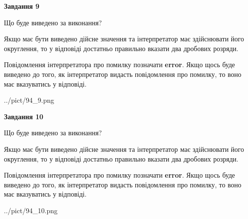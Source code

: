 \documentclass[12pt, ukrainian]{article}
\begin{document}
{\begin {Large}
{\begin {center}\textbf{Завдання 9}\end {center}}\par
Що буде виведено за виконання? \par

Якщо має бути виведено дійсне значення та інтерпретатор має здійснювати його округлення, 
то у відповіді достатньо правильно вказати два дробових розряди.

Повідомлення інтерпретатора про помилку позначати \textbf{error}.
Якщо щось буде виведено до того, як інтерпретатор видасть повідомлення про помилку, 
то воно має вказуватись у відповіді. \par

\begin{center}
	{../pict/94_9.png}
\end{center}
\newpage

{\begin {center}\textbf{Завдання 10}\end {center}}\par
Що буде виведено за виконання? \par

Якщо має бути виведено дійсне значення та інтерпретатор має здійснювати його округлення, 
то у відповіді достатньо правильно вказати два дробових розряди.

Повідомлення інтерпретатора про помилку позначати \textbf{error}.
Якщо щось буде виведено до того, як інтерпретатор видасть повідомлення про помилку, 
то воно має вказуватись у відповіді. \par

\begin{center}
	{../pict/94_10.png}
\end{center}
\newpage

\end {Large}}
\end{document}
